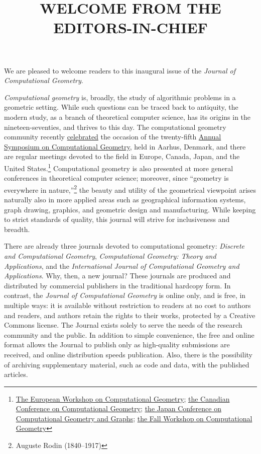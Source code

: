 \documentclass{jocg}
\title{
  \MakeUppercase{Welcome from the Editors-in-Chief}
}
\theoremstyle{plain}
\theoremstyle{definition}
\begin{document}
\maketitle

We are pleased to welcome readers to this inaugural issue of the
\textit{Journal of Computational Geometry}.

\textit{Computational geometry} is, broadly, the study of algorithmic problems in a
geometric setting. While such questions can be traced back to antiquity, the modern
study, as a branch of theoretical computer science, has its origins in the
nineteen-seventies, and thrives to this day. The computational geometry community recently
\href{http://www.madalgo.au.dk/socg2009/Html/Sattelite Events/25_Anniversary.html}{celebrated}
the occasion of the twenty-fifth \href{http://www.madalgo.au.dk/socg2009/index.html}{Annual Symposium on Computational Geometry},
held in Aarhus, Denmark, and there are regular meetings devoted to the field in 
Europe, Canada, Japan, and the United States.\footnote{%
\href{http://www.eurocg.org/}{The European Workshop on Computational Geometry};
\href{http://www.cccg.ca/}{the Canadian Conference on Computational Geometry};
\href{http://www.jaist.ac.jp/~uehara/JCCGG09/}{the Japan Conference on Computational Geometry and Graphs};
\href{http://www.cs.tufts.edu/research/geometry/FWCG09/}{the Fall Workshop on Computational Geometry}
} Computational geometry is also presented at more general conferences
in theoretical computer science; moreover, since ``geometry is everywhere in
nature,''\footnote{Auguste Rodin (1840--1917)} the beauty and utility of the geometrical
viewpoint arises naturally also in more applied areas such as geographical
information systems, graph drawing, graphics, and geometric design and
manufacturing. While keeping to strict standards of quality, this journal
will strive for inclusiveness and breadth.

There are already three journals devoted to computational geometry:
\textit{Discrete and Computational Geometry},
\textit{Computational Geometry: Theory and Applications},
and the
\textit{International Journal of Computational Geometry and Applications}.
Why, then, a new journal? These journals are produced and distributed
by commercial publishers in the traditional hardcopy form.
In contrast, the \textit{Journal of Computational Geometry} is
online only, and is free, in multiple ways: it is available
without restriction to readers
at no cost to authors and readers, and authors retain the rights to their works,
protected by a Creative Commons license. The Journal exists solely to serve
the needs of the research community and the public. In addition to simple
convenience, the free and online format allows the Journal to publish only as
high-quality submissions are received, and online distribution speeds
publication. Also, there is the possibility of archiving supplementary
material, such as code and data, with the published articles.
\end{document}
